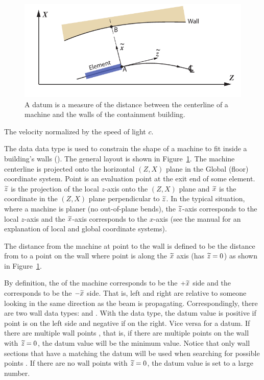 \begin{description}
{\begin{figure}
  \centering
  \includegraphics[width=5in]{building-wall-constraint.pdf}
  \caption[Building wall datum]
{A  datum is a measure of the distance between the
centerline of a machine and the walls of the containment building.}
  \label{f:wall.constraint}
\end{figure}

  \item[velocity, velocity.x, .y, .z] \Newline
The velocity normalized by the speed of light $c$.

  \item[wall.left_side, .right_side] \Newline
The  data data type is used to constrain the shape of a machine to fit
inside a building's walls (). The general layout is shown in
Figure~\ref{f:wall.constraint}. The machine centerline is projected onto the horizontal
$(Z, X)$ plane in the Global (floor) coordinate system. Point  is an evaluation
point at the exit end of some element. $\widetilde z$ is the projection of the local $z$-axis
onto the $(Z, X)$ plane and $\widetilde x$ is the coordinate in the $(Z, X)$ plane perpendicular
to $\widetilde z$. In the typical situation, where a machine is planer (no out-of-plane bends),
the $\widetilde z$-axis corresponds to the local $z$-axis and the $\widetilde x$-axis corresponds to the
$x$-axis (see the \bmad manual for an explanation of local and global coordinate systems).

The distance from the machine at point  to the wall is defined to be the distance
from  to a point  on the wall where point  is along the $\widetilde x$ axis
(has $\widetilde z = 0$) as shown in Figure~\ref{f:wall.constraint}.

By definition, the  of the machine corresponds to be the $+\widetilde x$ side
and the  corresponds to be the $-\widetilde x$ side. That is, left and right
are relative to someone looking in the same direction as the beam is
propagating. Correspondingly, there are two wall data types:  and
. With the  data type, the datum value is positive
if point  is on the left side and negative if on the right. Vice versa for a
 datum.  If there are multiple wall points , that is, if there
are multiple points on the wall with $\widetilde z = 0$, the datum value will be the minimum
value. Notice that only wall sections that have a  matching the datum will
be used when searching for possible points . If there are no wall points with $\widetilde z
= 0$, the datum value is set to a large number.

}
\end{description}
